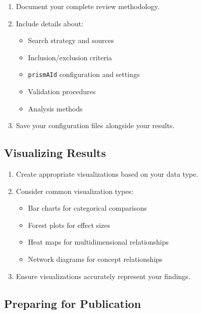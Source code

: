 \begin{enumerate}
    \item Document your complete review methodology.
    \item Include details about:
    \begin{itemize}
        \item Search strategy and sources
        \item Inclusion/exclusion criteria
        \item \texttt{prismAId} configuration and settings
        \item Validation procedures
        \item Analysis methods
    \end{itemize}
    \item Save your configuration files alongside your results.
\end{enumerate}

\subsection{Visualizing Results}

\begin{enumerate}
    \item Create appropriate visualizations based on your data type.
    \item Consider common visualization types:
    \begin{itemize}
        \item Bar charts for categorical comparisons
        \item Forest plots for effect sizes
        \item Heat maps for multidimensional relationships
        \item Network diagrams for concept relationships
    \end{itemize}
    \item Ensure visualizations accurately represent your findings.
\end{enumerate}

\subsection{Preparing for Publication}

